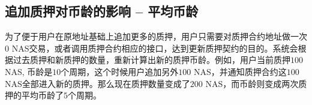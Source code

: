\subsection{追加质押对币龄的影响 -- 平均币龄}
为了便于用户在原地址基础上追加更多的质押，用户只需要对质押合约地址做一次$0$ NAS交易，或者调用质押合约相应的接口，达到更新质押契约的目的。系统会根据过去质押和新质押的数量，重新计算出新的质押币龄。例如，用户当前质押$100$NAS, 币龄是$10$个周期，这个时候用户追加另外$100$ NAS，并通知质押合约这$100$ NAS全部进入新的质押。那么现在质押数量变成了$200$ NAS，而币龄则变成两次质押的平均币龄了$5$个周期。